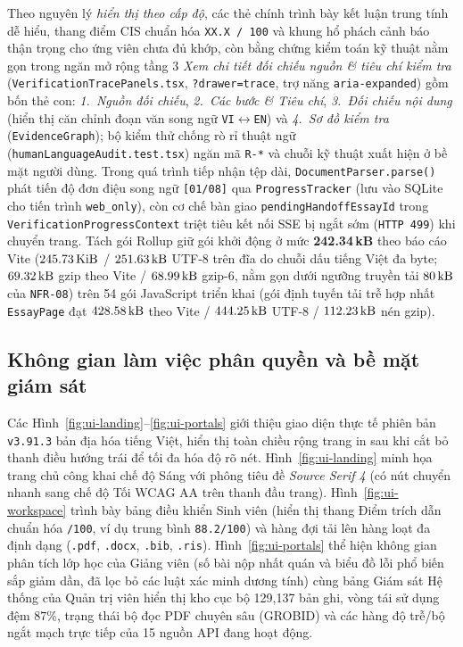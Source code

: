 Theo nguyên lý \emph{hiển thị theo cấp độ}, các thẻ chính trình bày kết luận trung tính dễ hiểu, thang điểm CIS chuẩn hóa \texttt{XX.X / 100} và khung hổ phách cảnh báo thận trọng cho ứng viên chưa đủ khớp, còn bằng chứng kiểm toán kỹ thuật nằm gọn trong ngăn mở rộng tầng 3 \textit{Xem chi tiết đối chiếu nguồn \& tiêu chí kiểm tra} (\texttt{VerificationTracePanels.tsx}, \texttt{?drawer=trace}, trợ năng \texttt{aria-expanded}) gồm bốn thẻ con: \textit{1.~Nguồn đối chiếu}, \textit{2.~Các bước \& Tiêu chí}, \textit{3.~Đối chiếu nội dung} (hiển thị căn chỉnh đoạn văn song ngữ \texttt{VI}$\leftrightarrow$\texttt{EN}) và \textit{4.~Sơ đồ kiểm tra} (\texttt{EvidenceGraph}); bộ kiểm thử chống rò rỉ thuật ngữ (\texttt{humanLanguageAudit.test.tsx}) ngăn mã \texttt{R-*} và chuỗi kỹ thuật xuất hiện ở bề mặt người dùng. Trong quá trình tiếp nhận tệp dài, \texttt{DocumentParser.parse()} phát tiến độ đơn điệu song ngữ \texttt{[01/08]} qua \texttt{ProgressTracker} (lưu vào SQLite cho tiến trình \texttt{web\_only}), còn cơ chế bàn giao \texttt{pendingHandoffEssayId} trong \texttt{VerificationProgressContext} triệt tiêu kết nối SSE bị ngắt sớm (\texttt{HTTP 499}) khi chuyển trang. Tách gói Rollup giữ gói khởi động ở mức \textbf{242.34\,kB} theo báo cáo Vite ($245.73\text{\,KiB}$ / $251.63\text{\,kB}$ UTF-8 trên đĩa do chuỗi dấu tiếng Việt đa byte; $69.32\text{\,kB}$ gzip theo Vite / $68.99\text{\,kB}$ gzip-6, nằm gọn dưới ngưỡng truyền tải $80\text{\,kB}$ của \texttt{NFR-08}) trên 54 gói JavaScript triển khai (gói định tuyến tải trễ hợp nhất \texttt{EssayPage} đạt $428.58\text{\,kB}$ theo Vite / $444.25\text{\,kB}$ UTF-8 / $112.23\text{\,kB}$ nén gzip).

\subsection{Không gian làm việc phân quyền và bề mặt giám sát}

Các Hình~\ref{fig:ui-landing}--\ref{fig:ui-portals} giới thiệu giao diện thực tế phiên bản \texttt{v3.91.3} bản địa hóa tiếng Việt, hiển thị toàn chiều rộng trang in sau khi cắt bỏ thanh điều hướng trái để tối đa hóa độ rõ nét. Hình~\ref{fig:ui-landing} minh họa trang chủ công khai chế độ Sáng với phông tiêu đề \textit{Source Serif 4} (có nút chuyển nhanh sang chế độ Tối WCAG AA trên thanh đầu trang). Hình~\ref{fig:ui-workspace} trình bày bảng điều khiển Sinh viên (hiển thị thang Điểm trích dẫn chuẩn hóa \texttt{/100}, ví dụ trung bình \texttt{88.2/100}) và hàng đợi tải lên hàng loạt đa định dạng (\texttt{.pdf}, \texttt{.docx}, \texttt{.bib}, \texttt{.ris}). Hình~\ref{fig:ui-portals} thể hiện không gian phân tích lớp học của Giảng viên (số bài nộp nhất quán và biểu đồ lỗi phổ biến sắp giảm dần, đã lọc bỏ các luật xác minh dương tính) cùng bảng Giám sát Hệ thống của Quản trị viên hiển thị kho cục bộ 129,137 bản ghi, vòng tái sử dụng đệm $87\%$, trạng thái bộ đọc PDF chuyên sâu (GROBID) và các hàng độ trễ/bộ ngắt mạch trực tiếp của 15 nguồn API đang hoạt động.

